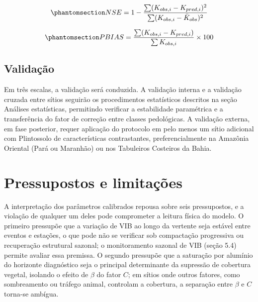 \documentclass[
  brazilian,
  authoryear,
  preprint]{elsarticle}
\begin{document}
\begin{equation}\phantomsection\label{eq-nse}{
NSE = 1 - \dfrac{\sum(K_{obs,i} - K_{pred,i})^2}{\sum(K_{obs,i} - \bar{K}_{obs})^2}
}\end{equation}

\begin{equation}\phantomsection\label{eq-pbias}{
PBIAS = \dfrac{\sum(K_{obs,i} - K_{pred,i})}{\sum K_{obs,i}} \times 100
}\end{equation}

\subsection{Validação}\label{validauxe7uxe3o}

Em três escalas, a validação será conduzida. A validação interna e a
validação cruzada entre sítios seguirão os procedimentos estatísticos
descritos na seção Análises estatísticas, permitindo verificar a
estabilidade paramétrica e a transferência do fator de correção entre
classes pedológicas. A validação externa, em fase posterior, requer
aplicação do protocolo em pelo menos um sítio adicional com Plintossolo
de características contrastantes, preferencialmente na Amazônia Oriental
(Pará ou Maranhão) ou nos Tabuleiros Costeiros da Bahia.

\section{Pressupostos e
limitações}\label{pressupostos-e-limitauxe7uxf5es}

A interpretação dos parâmetros calibrados repousa sobre seis
pressupostos, e a violação de qualquer um deles pode comprometer a
leitura física do modelo. O primeiro pressupõe que a variação de VIB ao
longo da vertente seja estável entre eventos e estações, o que pode não
se verificar sob compactação progressiva ou recuperação estrutural
sazonal; o monitoramento sazonal de VIB (seção 5.4) permite avaliar essa
premissa. O segundo pressupõe que a saturação por alumínio do horizonte
diagnóstico seja o principal determinante da supressão de cobertura
vegetal, isolando o efeito de \(\beta\) do fator \(C\); em sítios onde
outros fatores, como sombreamento ou tráfego animal, controlam a
cobertura, a separação entre \(\beta\) e \(C\) torna-se ambígua.
\end{document}
